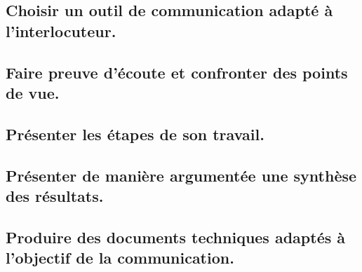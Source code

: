 \documentclass[10pt,fleqn]{book}
\newcommand{\repRel}{../..}
\newcommand{\repStyle}{\repRel/Style}
\newcommand{\td}{fichier_td}
\newcommand{\repExos}{\repRel/ExercicesCompetences}
\newcommand{\repExo}{dossier}
\begin{document}
\subsection{Choisir un outil de communication adapté à l’interlocuteur.} 

\subsection{Faire preuve d’écoute et confronter des points de vue.} 

\subsection{Présenter les étapes de son travail.} 

\subsection{Présenter de manière argumentée une synthèse des résultats.} 

\subsection{Produire des documents techniques adaptés à l'objectif de la communication. } 

\renewcommand{\repExo}{\repExos/E2_ProduireInformation/E2_05_Dessin2D/1000_Dessin2D}
\renewcommand{\td}{1000_Dessin2D}
\graphicspath{{\repStyle/png/}{\repExo/images/}}


\renewcommand{\repExo}{\repExos/E2_ProduireInformation/E2_05_Dessin2D/1001_Dessin2D}
\renewcommand{\td}{1001_Dessin2D}
\graphicspath{{\repStyle/png/}{\repExo/images/}}


\renewcommand{\repExo}{\repExos/E2_ProduireInformation/E2_05_Dessin2D/1002_Dessin2D}
\renewcommand{\td}{1002_Dessin2D}
\graphicspath{{\repStyle/png/}{\repExo/images/}}


\renewcommand{\repExo}{\repExos/E2_ProduireInformation/E2_05_Dessin2D/1003_Dessin2D}
\renewcommand{\td}{1003_Dessin2D}
\graphicspath{{\repStyle/png/}{\repExo/images/}}


\renewcommand{\repExo}{\repExos/E2_ProduireInformation/E2_05_Dessin2D/1004_Dessin2D}
\renewcommand{\td}{1004_Dessin2D}
\graphicspath{{\repStyle/png/}{\repExo/images/}}


\renewcommand{\repExo}{\repExos/E2_ProduireInformation/E2_05_Dessin2D/1005_Dessin2D}
\renewcommand{\td}{1005_Dessin2D}
\graphicspath{{\repStyle/png/}{\repExo/images/}}

\end{document}
